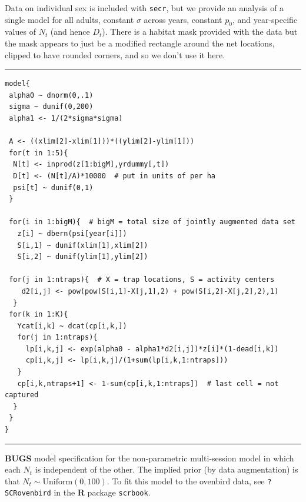 Data on individual sex is included
with \mbox{\tt secr}, but  we provide an analysis of a single model
for all adults, constant $\sigma$ across years, constant $p_{0}$, and
year-specific values of $N_{t}$ (and hence $D_{t}$).
 There is a habitat mask provided with the data but the mask
appears to just be a modified rectangle around the net locations,
clipped to have rounded corners, and so we don't use it here.






\begin{panel}[htp]
\centering
\rule[0.15in]{\textwidth}{.03in}
{\small
\begin{verbatim}
model{
 alpha0 ~ dnorm(0,.1)
 sigma ~ dunif(0,200)
 alpha1 <- 1/(2*sigma*sigma)

 A <- ((xlim[2]-xlim[1]))*((ylim[2]-ylim[1]))
 for(t in 1:5){
  N[t] <- inprod(z[1:bigM],yrdummy[,t])
  D[t] <- (N[t]/A)*10000  # put in units of per ha
  psi[t] ~ dunif(0,1)
 }

 for(i in 1:bigM){  # bigM = total size of jointly augmented data set
   z[i] ~ dbern(psi[year[i]])
   S[i,1] ~ dunif(xlim[1],xlim[2])
   S[i,2] ~ dunif(ylim[1],ylim[2])

 for(j in 1:ntraps){  # X = trap locations, S = activity centers
    d2[i,j] <- pow(pow(S[i,1]-X[j,1],2) + pow(S[i,2]-X[j,2],2),1)
  }
 for(k in 1:K){
   Ycat[i,k] ~ dcat(cp[i,k,])
   for(j in 1:ntraps){
     lp[i,k,j] <- exp(alpha0 - alpha1*d2[i,j])*z[i]*(1-dead[i,k])
     cp[i,k,j] <- lp[i,k,j]/(1+sum(lp[i,k,1:ntraps]))
   }
   cp[i,k,ntraps+1] <- 1-sum(cp[i,k,1:ntraps])  # last cell = not captured
  } 
 }  
}
\end{verbatim}
}
\rule[-0.15in]{\textwidth}{.03in}
\caption{
{\bf BUGS} model specification for the non-parametric multi-session
model in which each $N_{t}$ is independent of the other. The implied
prior (by data augmentation) is that $N_{t} \sim
\mbox{Uniform}(0,100)$.
To fit this model to the ovenbird data, see
 \mbox{\tt ?SCRovenbird} in the {\bf R} package \mbox{\tt scrbook}.
}
\label{poisson-mn.panel.ovenbird}
\end{panel}


